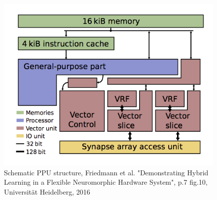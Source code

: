 \documentclass[10pt]{beamer}
\begin{document}
\begin{frame}
	\begin{figure}
		\includegraphics[scale=0.8]{Fig11.png} 
		\caption{Schematic PPU structure, Friedmann et al. "Demonstrating Hybrid Learning in a Flexible Neuromorphic Hardware System", p.7 fig.10, Universität Heidelberg, 2016} \label{fig:PPU}
	\end{figure}
\end{frame}
\end{document}
